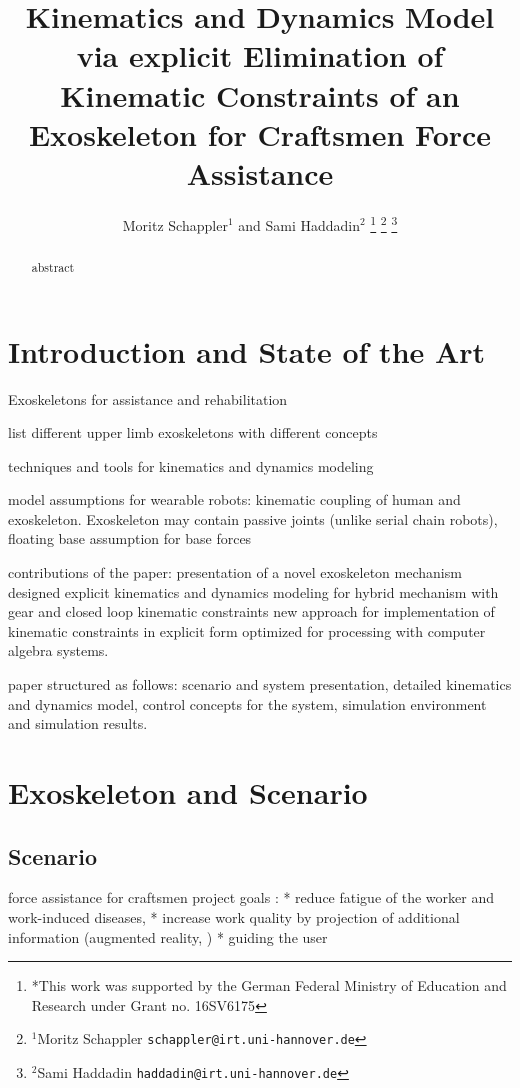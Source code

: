 \documentclass[letterpaper, 10 pt, conference]{ieeeconf}  %
\title{\LARGE \bf
Kinematics and Dynamics Model via explicit Elimination of Kinematic Constraints of an Exoskeleton for Craftsmen Force Assistance
}
\author{Moritz Schappler$^{1}$ and Sami Haddadin$^{2}$%
\thanks{*This work was supported by the German Federal Ministry of Education and Research under Grant no. 16SV6175}%
\thanks{$^{1}$Moritz Schappler
        {\tt\small schappler@irt.uni-hannover.de}}%
\thanks{$^{2}$Sami Haddadin
        {\tt\small haddadin@irt.uni-hannover.de}}%
}
\begin{document}
\maketitle
\thispagestyle{empty}
\pagestyle{empty}


\begin{abstract}

abstract

\end{abstract}


\section{Introduction and State of the Art}

Exoskeletons for assistance and rehabilitation

list different upper limb exoskeletons with different concepts

techniques and tools for kinematics and dynamics modeling

model assumptions for wearable robots: kinematic coupling of human and exoskeleton. Exoskeleton may contain passive joints (unlike serial chain robots), floating base assumption for base forces

contributions of the paper:
presentation of a novel exoskeleton mechanism designed
explicit kinematics and dynamics modeling for hybrid mechanism with gear and closed loop kinematic constraints
new approach for implementation of kinematic constraints in explicit form optimized for processing with computer algebra systems.

paper structured as follows: scenario and system presentation, detailed kinematics and dynamics model, control concepts for the system, simulation environment and simulation results.

\section{Exoskeleton and Scenario}

\subsection{Scenario}

force assistance for craftsmen
project goals \cite{NuelleSchTapLil2017}: 
* reduce fatigue of the worker and work-induced diseases, 
* increase work quality by projection of additional information (augmented reality, \cite{NuelleBriTapDem2018})
* guiding the user
\end{document}
